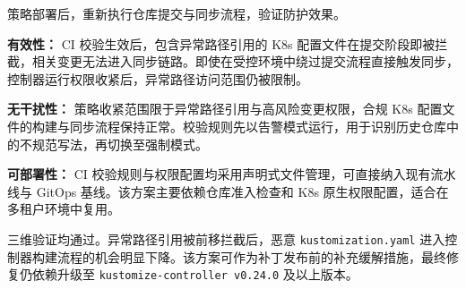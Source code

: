 策略部署后，重新执行仓库提交与同步流程，验证防护效果。

\textbf{有效性：}
CI 校验生效后，包含异常路径引用的 K8s 配置文件在提交阶段即被拦截，相关变更无法进入同步链路。即使在受控环境中绕过提交流程直接触发同步，控制器运行权限收紧后，异常路径访问范围仍被限制。

\textbf{无干扰性：}
策略收紧范围限于异常路径引用与高风险变更权限，合规 K8s 配置文件的构建与同步流程保持正常。校验规则先以告警模式运行，用于识别历史仓库中的不规范写法，再切换至强制模式。

\textbf{可部署性：}
CI 校验规则与权限配置均采用声明式文件管理，可直接纳入现有流水线与 GitOps 基线。该方案主要依赖仓库准入检查和 K8s 原生权限配置，适合在多租户环境中复用。

三维验证均通过。异常路径引用被前移拦截后，恶意 \texttt{kustomization\allowbreak.yaml} 进入控制器构建流程的机会明显下降。该方案可作为补丁发布前的补充缓解措施，最终修复仍依赖升级至 \texttt{kustomize-controller v0.24.0} 及以上版本。
